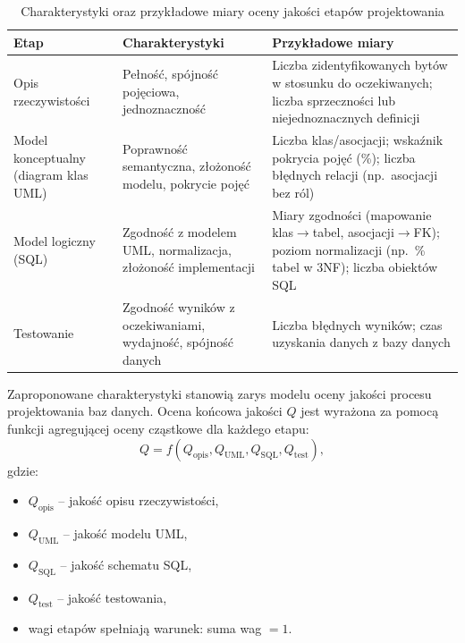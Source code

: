 \begin{table}[!ht]
  \centering
  \caption{Charakterystyki oraz przykładowe miary oceny jakości etapów projektowania}
  \label{tab:etapy-char-miary}
  \scriptsize
  \begin{tabularx}{\textwidth}{LLp{5cm}}
    \toprule
    \textbf{Etap} & \textbf{Charakterystyki} & \textbf{Przykładowe miary} \\
    \midrule
    Opis rzeczywistości &
    Pełność, spójność pojęciowa, jednoznaczność &
    Liczba zidentyfikowanych bytów w stosunku do oczekiwanych; liczba sprzeczności lub niejednoznacznych definicji \\
    Model konceptualny (diagram klas UML) &
    Poprawność semantyczna, złożoność modelu, pokrycie pojęć &
    Liczba klas/asocjacji; wskaźnik pokrycia pojęć (\%); liczba błędnych relacji (np.\ asocjacji bez ról) \\
    Model logiczny (SQL) &
    Zgodność z modelem UML, normalizacja, złożoność implementacji &
    Miary zgodności (mapowanie klas$\rightarrow$tabel, asocjacji$\rightarrow$FK); poziom normalizacji (np.\ \% tabel w 3NF); liczba obiektów SQL \\
    Testowanie &
    Zgodność wyników z oczekiwaniami, wydajność, spójność danych &
    Liczba błędnych wyników; czas uzyskania danych z bazy danych \\
    \bottomrule
  \end{tabularx}
\end{table}

Zaproponowane charakterystyki stanowią zarys modelu oceny jakości procesu projektowania baz danych. Ocena końcowa jakości $Q$ jest wyrażona za pomocą funkcji agregującej oceny cząstkowe dla każdego etapu:
\begin{equation}
  Q = f(Q_{\mathrm{opis}}, Q_{\mathrm{UML}}, Q_{\mathrm{SQL}}, Q_{\mathrm{test}}),
\end{equation}
gdzie:
\begin{itemize}
  \item $Q_{\mathrm{opis}}$ -- jakość opisu rzeczywistości,
  \item $Q_{\mathrm{UML}}$ -- jakość modelu UML,
  \item $Q_{\mathrm{SQL}}$ -- jakość schematu SQL,
  \item $Q_{\mathrm{test}}$ -- jakość testowania,
  \item wagi etapów spełniają warunek: suma wag $=1$.
\end{itemize}

